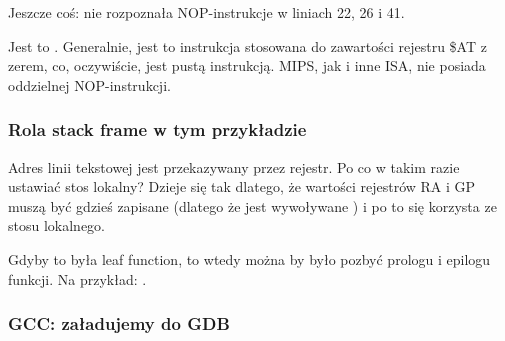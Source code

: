 Jeszcze coś: \IDA nie rozpoznała \ac{NOP}-instrukcje w liniach 22, 26 i 41.

Jest to .
Generalnie, jest to instrukcja  stosowana do zawartości rejestru \$AT z zerem,
co, oczywiście, jest pustą instrukcją.
MIPS, jak i inne \ac{ISA}, nie posiada oddzielnej \ac{NOP}-instrukcji.

\subsubsection{Rola stack frame w tym przykładzie}

Adres linii tekstowej jest przekazywany przez rejestr.
Po co w takim razie ustawiać stos lokalny?
Dzieje się tak dlatego, że wartości rejestrów \ac{RA} i GP muszą być gdzieś zapisane
(dlatego że jest wywoływane \printf) i po to się korzysta ze stosu lokalnego.

Gdyby to była \gls{leaf function}, to wtedy można by było pozbyć prologu i epilogu funkcji. Na przykład:
 .

\subsubsection{\Optimizing GCC: załadujemy do GDB}




